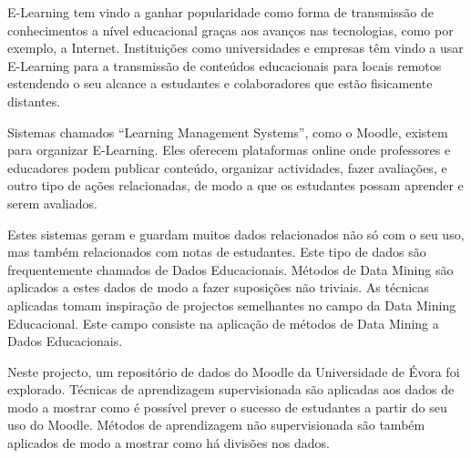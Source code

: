 \begin{tueSUMARIO}

E-Learning tem vindo a ganhar popularidade como forma de transmissão de
conhecimentos a nível educacional graças aos avanços nas tecnologias, como por
exemplo, a Internet. Instituições como universidades e empresas têm vindo a
usar E-Learning para a transmissão de conteúdos educacionais para locais
remotos estendendo o seu alcance a estudantes e colaboradores que estão
fisicamente distantes.

Sistemas chamados ``Learning Management Systems'', como o Moodle, existem para
organizar E-Learning. Eles oferecem plataformas online onde professores e
educadores podem publicar conteúdo, organizar actividades, fazer avaliações, e
outro tipo de ações relacionadas, de modo a que os estudantes possam aprender e
serem avaliados.

Estes sistemas geram e guardam muitos dados relacionados não só com o seu uso,
mas também relacionados com notas de estudantes. Este tipo de dados são
frequentemente chamados de Dados Educacionais. Métodos de Data Mining são
aplicados a estes dados de modo a fazer suposições não triviais. As técnicas
aplicadas tomam inspiração de projectos semelhantes no campo da Data Mining
Educacional. Este campo consiste na aplicação de métodos de Data Mining a Dados
Educacionais.

Neste projecto, um repositório de dados do Moodle da Universidade de Évora foi
explorado. Técnicas de aprendizagem supervisionada são aplicadas aos dados de
modo a mostrar como é possível prever o sucesso de estudantes a partir do seu
uso do Moodle. Métodos de aprendizagem não supervisionada são também aplicados
de modo a mostrar como há divisões nos dados.

\end{tueSUMARIO}
